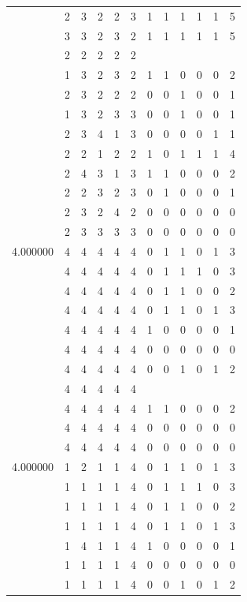 \documentclass[]{book}
\theoremstyle{definition}
\theoremstyle{definition}
\theoremstyle{definition}
\theoremstyle{remark}
\begin{document}
\begin{table}
{\begin{tabular}[t]{rrrrrrrrrrrr}
 & 2 & 3 & 2 & 2 & 3 & 1 & 1 & 1 & 1 & 1 & 5\\
 & 3 & 3 & 2 & 3 & 2 & 1 & 1 & 1 & 1 & 1 & 5\\
 & 2 & 2 & 2 & 2 & 2 &  &  &  &  &  & \\
 & 1 & 3 & 2 & 3 & 2 & 1 & 1 & 0 & 0 & 0 & 2\\
 & 2 & 3 & 2 & 2 & 2 & 0 & 0 & 1 & 0 & 0 & 1\\
 & 1 & 3 & 2 & 3 & 3 & 0 & 0 & 1 & 0 & 0 & 1\\
 & 2 & 3 & 4 & 1 & 3 & 0 & 0 & 0 & 0 & 1 & 1\\
 & 2 & 2 & 1 & 2 & 2 & 1 & 0 & 1 & 1 & 1 & 4\\
 & 2 & 4 & 3 & 1 & 3 & 1 & 1 & 0 & 0 & 0 & 2\\
 & 2 & 2 & 3 & 2 & 3 & 0 & 1 & 0 & 0 & 0 & 1\\
 & 2 & 3 & 2 & 4 & 2 & 0 & 0 & 0 & 0 & 0 & 0\\
 & 2 & 3 & 3 & 3 & 3 & 0 & 0 & 0 & 0 & 0 & 0\\
4.000000 & 4 & 4 & 4 & 4 & 4 & 0 & 1 & 1 & 0 & 1 & 3\\
 & 4 & 4 & 4 & 4 & 4 & 0 & 1 & 1 & 1 & 0 & 3\\
 & 4 & 4 & 4 & 4 & 4 & 0 & 1 & 1 & 0 & 0 & 2\\
 & 4 & 4 & 4 & 4 & 4 & 0 & 1 & 1 & 0 & 1 & 3\\
 & 4 & 4 & 4 & 4 & 4 & 1 & 0 & 0 & 0 & 0 & 1\\
 & 4 & 4 & 4 & 4 & 4 & 0 & 0 & 0 & 0 & 0 & 0\\
 & 4 & 4 & 4 & 4 & 4 & 0 & 0 & 1 & 0 & 1 & 2\\
 & 4 & 4 & 4 & 4 & 4 &  &  &  &  &  & \\
 & 4 & 4 & 4 & 4 & 4 & 1 & 1 & 0 & 0 & 0 & 2\\
 & 4 & 4 & 4 & 4 & 4 & 0 & 0 & 0 & 0 & 0 & 0\\
 & 4 & 4 & 4 & 4 & 4 & 0 & 0 & 0 & 0 & 0 & 0\\
4.000000 & 1 & 2 & 1 & 1 & 4 & 0 & 1 & 1 & 0 & 1 & 3\\
 & 1 & 1 & 1 & 1 & 4 & 0 & 1 & 1 & 1 & 0 & 3\\
 & 1 & 1 & 1 & 1 & 4 & 0 & 1 & 1 & 0 & 0 & 2\\
 & 1 & 1 & 1 & 1 & 4 & 0 & 1 & 1 & 0 & 1 & 3\\
 & 1 & 4 & 1 & 1 & 4 & 1 & 0 & 0 & 0 & 0 & 1\\
 & 1 & 1 & 1 & 1 & 4 & 0 & 0 & 0 & 0 & 0 & 0\\
 & 1 & 1 & 1 & 1 & 4 & 0 & 0 & 1 & 0 & 1 & 2\\

\end{tabular}}
\end{table}
\end{document}
